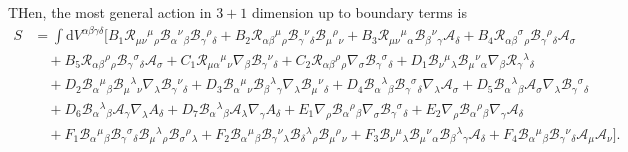 \documentclass[10pt,a4paper]{article}
\begin{document}
THen, the most general action in $3+1$ dimension up to boundary terms is
\begin{equation*}
    \begin{split}
      S
      & =
      \int  \mathrm{d}V^{\alpha \beta \gamma \delta} \bigg[
      B_1 \mathcal{R}_{\mu\nu}{}^{\mu}{}_{\rho}\mathcal{B}_{\alpha}{}^{\nu}{}_{\beta}\mathcal{B}_{\gamma}{}^{\rho}{}_{\delta}
      + B_2 \mathcal{R}_{\alpha\beta}{}^{\mu}{}_{\rho} \mathcal{B}_{\gamma}{}^{\nu}{}_{\delta} \mathcal{B}_{\mu}{}^{\rho}{}_{\nu}
      + B_3 \mathcal{R}_{\mu\nu}{}^{\mu}{}_{\alpha} \mathcal{B}_{\beta}{}^{\nu}{}_{\gamma} \mathcal{A}_\delta
      + B_4 \mathcal{R}_{\alpha\beta}{}^{\sigma}{}_{\rho}\mathcal{B}_{\gamma}{}^{\rho}{}_{\delta}\mathcal{A}_\sigma
      \\
      & \quad
      + B_5 \mathcal{R}_{\alpha \beta}{}^{\rho}{}_{\rho} \mathcal{B}_{\gamma}{}^{\sigma}{}_{\delta} \mathcal{A}_\sigma
      + C_1 \mathcal{R}_{\mu\alpha}{}^{\mu}{}_{\nu} \nabla_\beta \mathcal{B}_{\gamma}{}^{\nu}{}_{\delta}
      + C_2 \mathcal{R}_{\alpha\beta}{}^{\rho}{}_{\rho} \nabla_\sigma \mathcal{B}_{\gamma}{}^{\sigma}{}_{\delta}
      + D_1 \mathcal{B}_{\nu}{}^{\mu}{}_{\lambda} \mathcal{B}_{\mu}{}^{\nu}{}_{\alpha} \nabla_\beta \mathcal{R}_{\gamma}{}^{\lambda}{}_{\delta}
      \\
      & \quad
      + D_2 \mathcal{B}_{\alpha}{}^{\mu}{}_{\beta} \mathcal{B}_{\mu}{}^{\lambda}{}_{\nu} \nabla_{\lambda} \mathcal{B}_{\gamma}{}^{\nu}{}_{\delta}
      + D_3 \mathcal{B}_{\alpha}{}^{\mu}{}_{\nu}\mathcal{B}_{\beta}{}^{\lambda}{}_{\gamma} \nabla_\lambda \mathcal{B}_{\mu}{}^{\nu}{}_{\delta}
      + D_4 \mathcal{B}_{\alpha}{}^{\lambda}{}_{\beta}\mathcal{B}_{\gamma}{}^{\sigma}{}_{\delta}\nabla_\lambda \mathcal{A}_\sigma
      + D_5 \mathcal{B}_{\alpha}{}^{\lambda}{}_{\beta} \mathcal{A}_\sigma \nabla_\lambda \mathcal{B}_{\gamma}{}^{\sigma}{}_{\delta}
      \\
      & \quad
      + D_6 \mathcal{B}_{\alpha}{}^{\lambda}{}_{\beta}\mathcal{A}_\gamma \nabla_\lambda A_\delta
      + D_7\mathcal{B}_{\alpha}{}^{\lambda}{}_{\beta} \mathcal{A}_\lambda \nabla_\gamma A_\delta
      + E_1\nabla_\rho \mathcal{B}_{\alpha}{}^{\rho}{}_{\beta} \nabla_\sigma \mathcal{B}_{\gamma}{}^{\sigma}{}_{\delta}
      + E_2 \nabla_\rho \mathcal{B}_{\alpha}{}^{\rho}{}_{\beta} \nabla_\gamma \mathcal{A}_\delta
      \\
      &\quad
      + F_1 \mathcal{B}_{\alpha}{}^{\mu}{}_{\beta} \mathcal{B}_{\gamma}{}^{\sigma}{}_{\delta} \mathcal{B}_{\mu}{}^{\lambda}{}_{\rho} \mathcal{B}_{\sigma}{}^{\rho}{}_{\lambda}
      + F_2\mathcal{B}_{\alpha}{}^{\mu}{}_{\beta} \mathcal{B}_{\gamma}{}^{\nu}{}_{\lambda} \mathcal{B}_{\delta}{}^{\lambda}{}_{\rho} \mathcal{B}_{\mu}{}^{\rho}{}_{\nu}
      + F_3 \mathcal{B}_{\nu}{}^{\mu}{}_{\lambda} \mathcal{B}_{\mu}{}^{\nu}{}_{\alpha} \mathcal{B}_{\beta}{}^{\lambda}{}_{\gamma} \mathcal{A}_\delta
      + F_4 \mathcal{B}_{\alpha}{}^{\mu}{}_{\beta}\mathcal{B}_{\gamma}{}^{\nu}{}_{\delta}\mathcal{A}_\mu \mathcal{A}_\nu \bigg].
    \end{split}
  \end{equation*}
\end{document}
